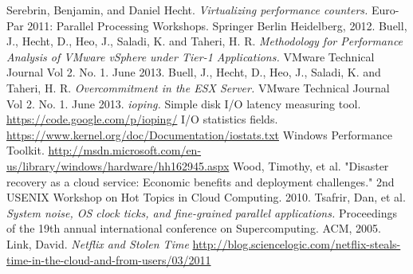 \begin{thebibliography}{9}
Serebrin, Benjamin, and Daniel Hecht.  \emph{Virtualizing performance counters.}  Euro-Par 2011: Parallel Processing Workshops. Springer Berlin Heidelberg, 2012.
Buell, J., Hecht, D., Heo, J., Saladi, K. and Taheri, H. R.  \emph{Methodology for Performance Analysis of VMware vSphere under Tier-1 Applications.}  VMware Technical Journal Vol 2. No. 1.  June 2013.
Buell, J., Hecht, D., Heo, J., Saladi, K. and Taheri, H. R.  \emph{Overcommitment in the ESX Server.}  VMware Technical Journal Vol 2. No. 1.  June 2013.
\emph{ioping.}  Simple disk I/O latency measuring tool.  \url{https://code.google.com/p/ioping/}
 I/O statistics fields. \url{https://www.kernel.org/doc/Documentation/iostats.txt}
 Windows Performance Toolkit. \url{http://msdn.microsoft.com/en-us/library/windows/hardware/hh162945.aspx}
 Wood, Timothy, et al. "Disaster recovery as a cloud service: Economic benefits and deployment challenges." 2nd USENIX Workshop on Hot Topics in Cloud Computing. 2010.
 Tsafrir, Dan, et al. \emph{System noise, OS clock ticks, and fine-grained parallel applications.} Proceedings of the 19th annual international conference on Supercomputing. ACM, 2005.
 Link, David.  \emph{Netflix and Stolen Time} \url{http://blog.sciencelogic.com/netflix-steals-time-in-the-cloud-and-from-users/03/2011} 
\end{thebibliography}


